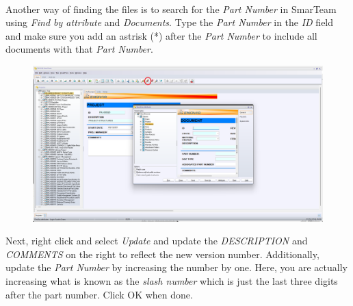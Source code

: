 \documentclass[10pt]{article}
\begin{document}
                \paragraph{}Another way of finding the files is to search for the \emph{Part Number} in SmarTeam using \emph{Find by attribute} and \emph{Documents}. Type the \emph{Part Number} in the \emph{ID} field and make sure you add an astrisk (*) after the \emph{Part Number} to include all documents with that \emph{Part Number}.
                \begin{figure}[H]
                    \centerline{\includegraphics[width=\textwidth]{References/ST Search.png}}
                \end{figure}
                Next, right click and select \emph{Update} and update the \emph{DESCRIPTION} and \emph{COMMENTS} on the right to reflect the new version number. Additionally, update the \emph{Part Number} by increasing the number by one. Here, you are actually increasing what is known as the \emph{slash number} which is just the last three digits after the part number. Click OK when done.
\end{document}
